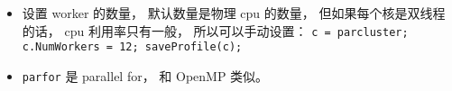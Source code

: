 
\begin{issues}
\issueDraft
\end{issues}

\begin{itemize}
\item 设置 worker 的数量， 默认数量是物理 cpu 的数量， 但如果每个核是双线程的话， cpu 利用率只有一般， 所以可以手动设置： \verb|c = parcluster; c.NumWorkers = 12; saveProfile(c);|
\item \verb|parfor| 是 parallel for， 和 OpenMP 类似。
\end{itemize}
